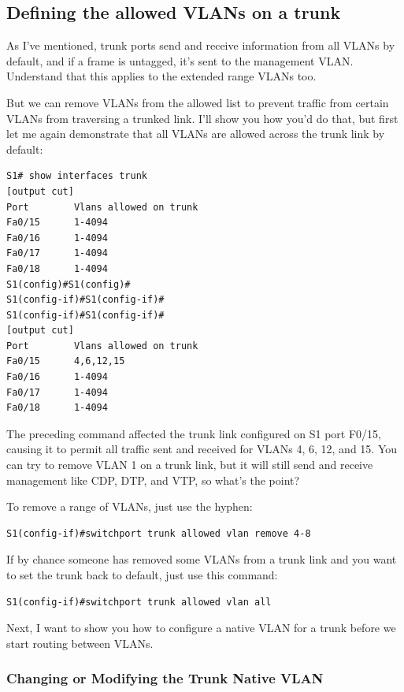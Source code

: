 \subsection{Defining the allowed VLANs on a trunk}

As I've mentioned, trunk ports send and receive information from all
VLANs by default, and if a frame is untagged, it's sent to the
management VLAN. Understand that this applies to the extended range
VLANs too.

But we can remove VLANs from the allowed list to prevent traffic from
certain VLANs from traversing a trunked link. I'll show you how you'd do
that, but first let me again demonstrate that all VLANs are allowed
across the trunk link by default:

\begin{verbatim}
S1# show interfaces trunk
[output cut]
Port        Vlans allowed on trunk
Fa0/15      1-4094
Fa0/16      1-4094
Fa0/17      1-4094
Fa0/18      1-4094
S1(config)#S1(config)#
S1(config-if)#S1(config-if)#
S1(config-if)#S1(config-if)#
[output cut]
Port        Vlans allowed on trunk
Fa0/15      4,6,12,15
Fa0/16      1-4094
Fa0/17      1-4094
Fa0/18      1-4094
\end{verbatim}

The preceding command affected the trunk link configured on S1 port
F0/15, causing it to permit all traffic sent and received for VLANs 4,
6, 12, and 15. You can try to remove VLAN 1 on a trunk link, but it will
still send and receive management like CDP, DTP, and VTP, so what's the
point?

To remove a range of VLANs, just use the hyphen:

\begin{verbatim}
S1(config-if)#switchport trunk allowed vlan remove 4-8
\end{verbatim}

If by chance someone has removed some VLANs from a trunk link and you
want to set the trunk back to default, just use this command:

\begin{verbatim}
S1(config-if)#switchport trunk allowed vlan all
\end{verbatim}

Next, I want to show you how to configure a native VLAN for a trunk
before we start routing between VLANs.

\subsubsection[Changing or Modifying the Trunk Native
VLAN]{\texorpdfstring{\protect\hypertarget{c11.xhtmlux5cux23c11-sec-13}{}{}Changing
or Modifying the Trunk Native
VLAN}{Changing or Modifying the Trunk Native VLAN}}

